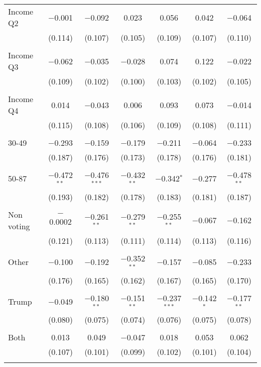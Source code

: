 \begin{tabular}{@{\extracolsep{5pt}}lcccccc}
 Income Q2 & $-$0.001 & $-$0.092 & 0.023 & 0.056 & 0.042 & $-$0.064 \\ 
  & (0.114) & (0.107) & (0.105) & (0.109) & (0.107) & (0.110) \\ 
  & & & & & & \\ 
 Income Q3 & $-$0.062 & $-$0.035 & $-$0.028 & 0.074 & 0.122 & $-$0.022 \\ 
  & (0.109) & (0.102) & (0.100) & (0.103) & (0.102) & (0.105) \\ 
  & & & & & & \\ 
 Income Q4 & 0.014 & $-$0.043 & 0.006 & 0.093 & 0.073 & $-$0.014 \\ 
  & (0.115) & (0.108) & (0.106) & (0.109) & (0.108) & (0.111) \\ 
  & & & & & & \\ 
 30-49 & $-$0.293 & $-$0.159 & $-$0.179 & $-$0.211 & $-$0.064 & $-$0.233 \\ 
  & (0.187) & (0.176) & (0.173) & (0.178) & (0.176) & (0.181) \\ 
  & & & & & & \\ 
 50-87 & $-$0.472$^{**}$ & $-$0.476$^{***}$ & $-$0.432$^{**}$ & $-$0.342$^{*}$ & $-$0.277 & $-$0.478$^{**}$ \\ 
  & (0.193) & (0.182) & (0.178) & (0.183) & (0.181) & (0.187) \\ 
  & & & & & & \\ 
 Non voting & $-$0.0002 & $-$0.261$^{**}$ & $-$0.279$^{**}$ & $-$0.255$^{**}$ & $-$0.067 & $-$0.162 \\ 
  & (0.121) & (0.113) & (0.111) & (0.114) & (0.113) & (0.116) \\ 
  & & & & & & \\ 
 Other & $-$0.100 & $-$0.192 & $-$0.352$^{**}$ & $-$0.157 & $-$0.085 & $-$0.233 \\ 
  & (0.176) & (0.165) & (0.162) & (0.167) & (0.165) & (0.170) \\ 
  & & & & & & \\ 
 Trump & $-$0.049 & $-$0.180$^{**}$ & $-$0.151$^{**}$ & $-$0.237$^{***}$ & $-$0.142$^{*}$ & $-$0.177$^{**}$ \\ 
  & (0.080) & (0.075) & (0.074) & (0.076) & (0.075) & (0.078) \\ 
  & & & & & & \\ 
 Both & 0.013 & 0.049 & $-$0.047 & 0.018 & 0.053 & 0.062 \\ 
  & (0.107) & (0.101) & (0.099) & (0.102) & (0.101) & (0.104) \\ 
  & & & & & & \\ 

\end{tabular}
